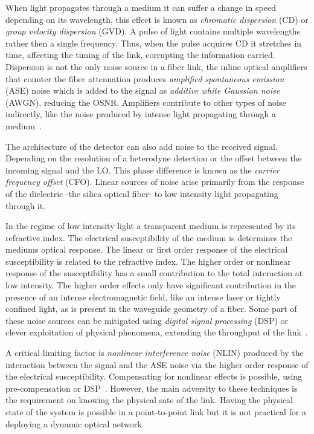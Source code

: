 When light propagates through a medium it can suffer a change in speed depending on its wavelength, this effect is known as \textit{chromatic dispersion} (CD) or \textit{group velocity dispersion} (GVD). A pulse of light contains multiple wavelengths  rather then a single frequency. Thus, when the pulse acquires CD it stretches in time, affecting the timing of the link, corrupting the information carried.  Dispersion is not the only noise source in a fiber link, the inline optical amplifiers that counter the fiber attenuation produces \textit{amplified spontaneous emission} (ASE) noise which is added to the signal as \textit{additive white Gaussian noise} (AWGN), reducing the OSNR. Amplifiers contribute to other types of noise indirectly, like the noise produced by intense light propagating through a medium~\cite{FiberAgrawal}.

The architecture of the detector can also add noise to the received signal. Depending on the resolution of a heterodyne detection or the offset between the incoming signal and the LO. This phase difference is known as the \textit{carrier frequency offset} (CFO). Linear sources of noise arise primarily from the response of the dielectric -the silica optical fiber- to low intensity light propagating through it. 

In the regime of low intensity light a transparent medium is represented by its refractive index. The electrical susceptibility of the medium is determines the mediums optical response. The linear or first order response of the electrical susceptibility is related to the refractive index. The higher order or nonlinear response of the susceptibility has a small contribution to the total interaction at low intensity. The higher order effects only have significant contribution in the presence of an intense electromagnetic field, like an intense laser or tightly confined light, as is present in the waveguide geometry of a fiber. Some part of these noise sources can be mitigated using \textit{digital signal processing} (DSP) or clever exploitation of physical phenomena, extending the throughput of the link~\cite{agrawalapplications}.     
      


A critical limiting factor is \textit{nonlinear interference noise} (NLIN) produced by the interaction between the signal and the ASE noise via the higher order response of the electrical susceptibility. Compensating for nonlinear effects is possible, using pre-compensation or DSP~\cite{NLPNinCFO}. However, the main adversity to these techniques is the requirement on knowing the physical sate of the link. 	Having the physical state of the system is possible in a point-to-point link but it is not practical for a deploying a dynamic optical network. 

